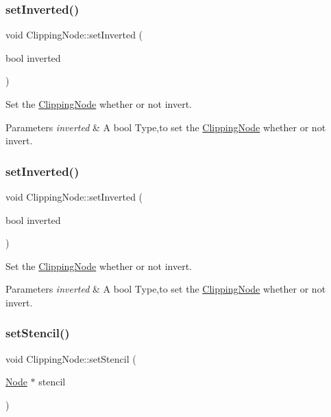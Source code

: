 \subsubsection{\texorpdfstring{set\+Inverted()}{setInverted()}\hspace{0.1cm}{\footnotesize\ttfamily [1/2]}}
{\footnotesize\ttfamily void Clipping\+Node\+::set\+Inverted (\begin{DoxyParamCaption}\item[{bool}]{inverted }\end{DoxyParamCaption})}

Set the \hyperlink{classClippingNode}{Clipping\+Node} whether or not invert.


\begin{DoxyParams}{Parameters}
{\em inverted} & A bool Type,to set the \hyperlink{classClippingNode}{Clipping\+Node} whether or not invert. \\
\hline
\end{DoxyParams}
\mbox{\label{classClippingNode_a0733496b02e0a3673ad3c8634ff757ed}} 
\subsubsection{\texorpdfstring{set\+Inverted()}{setInverted()}\hspace{0.1cm}{\footnotesize\ttfamily [2/2]}}
{\footnotesize\ttfamily void Clipping\+Node\+::set\+Inverted (\begin{DoxyParamCaption}\item[{bool}]{inverted }\end{DoxyParamCaption})}

Set the \hyperlink{classClippingNode}{Clipping\+Node} whether or not invert.


\begin{DoxyParams}{Parameters}
{\em inverted} & A bool Type,to set the \hyperlink{classClippingNode}{Clipping\+Node} whether or not invert. \\
\hline
\end{DoxyParams}
\mbox{\label{classClippingNode_ac8c8dfe6eb2eeb894546eef8b6404d71}} 
\subsubsection{\texorpdfstring{set\+Stencil()}{setStencil()}\hspace{0.1cm}{\footnotesize\ttfamily [1/2]}}
{\footnotesize\ttfamily void Clipping\+Node\+::set\+Stencil (\begin{DoxyParamCaption}\item[{\hyperlink{classNode}{Node} $\ast$}]{stencil }\end{DoxyParamCaption})}

